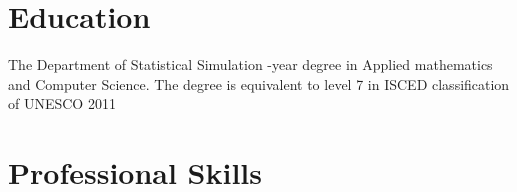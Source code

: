 \documentclass[11pt,a4paper]{moderncv-xetex}
\begin{document}
\section{Education}
\newline
    {
    The Department of Statistical Simulation -year degree in Applied mathematics and Computer Science. The degree is equivalent to level 7 in ISCED classification of UNESCO 2011
    }

\section{Professional Skills}

\end{document}
